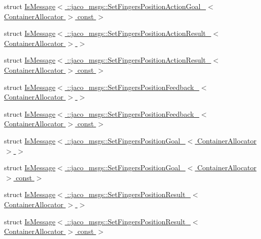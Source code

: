 \begin{DoxyCompactItemize}
\item 
struct \hyperlink{structros_1_1message__traits_1_1IsMessage_3_01_1_1jaco__msgs_1_1SetFingersPositionActionGoal___3cdf0887a72e87b8cff4cc9faad2fb585}{Is\+Message$<$ \+::jaco\+\_\+msgs\+::\+Set\+Fingers\+Position\+Action\+Goal\+\_\+$<$ Container\+Allocator $>$ const  $>$}
\item 
struct \hyperlink{structros_1_1message__traits_1_1IsMessage_3_01_1_1jaco__msgs_1_1SetFingersPositionActionResult__757ad1fe13355cb697d2ab8a4b4167d6}{Is\+Message$<$ \+::jaco\+\_\+msgs\+::\+Set\+Fingers\+Position\+Action\+Result\+\_\+$<$ Container\+Allocator $>$ $>$}
\item 
struct \hyperlink{structros_1_1message__traits_1_1IsMessage_3_01_1_1jaco__msgs_1_1SetFingersPositionActionResult__e9cfa5ea6f52c2558a064565c2b5cfc0}{Is\+Message$<$ \+::jaco\+\_\+msgs\+::\+Set\+Fingers\+Position\+Action\+Result\+\_\+$<$ Container\+Allocator $>$ const  $>$}
\item 
struct \hyperlink{structros_1_1message__traits_1_1IsMessage_3_01_1_1jaco__msgs_1_1SetFingersPositionFeedback___3_01ContainerAllocator_01_4_01_4}{Is\+Message$<$ \+::jaco\+\_\+msgs\+::\+Set\+Fingers\+Position\+Feedback\+\_\+$<$ Container\+Allocator $>$ $>$}
\item 
struct \hyperlink{structros_1_1message__traits_1_1IsMessage_3_01_1_1jaco__msgs_1_1SetFingersPositionFeedback___3_0b6f4c4f4ad48f6ea0780833a65c9145a}{Is\+Message$<$ \+::jaco\+\_\+msgs\+::\+Set\+Fingers\+Position\+Feedback\+\_\+$<$ Container\+Allocator $>$ const  $>$}
\item 
struct \hyperlink{structros_1_1message__traits_1_1IsMessage_3_01_1_1jaco__msgs_1_1SetFingersPositionGoal___3_01ContainerAllocator_01_4_01_4}{Is\+Message$<$ \+::jaco\+\_\+msgs\+::\+Set\+Fingers\+Position\+Goal\+\_\+$<$ Container\+Allocator $>$ $>$}
\item 
struct \hyperlink{structros_1_1message__traits_1_1IsMessage_3_01_1_1jaco__msgs_1_1SetFingersPositionGoal___3_01Conff0af772d8e2093cfa12496dacee7772}{Is\+Message$<$ \+::jaco\+\_\+msgs\+::\+Set\+Fingers\+Position\+Goal\+\_\+$<$ Container\+Allocator $>$ const  $>$}
\item 
struct \hyperlink{structros_1_1message__traits_1_1IsMessage_3_01_1_1jaco__msgs_1_1SetFingersPositionResult___3_01ContainerAllocator_01_4_01_4}{Is\+Message$<$ \+::jaco\+\_\+msgs\+::\+Set\+Fingers\+Position\+Result\+\_\+$<$ Container\+Allocator $>$ $>$}
\item 
struct \hyperlink{structros_1_1message__traits_1_1IsMessage_3_01_1_1jaco__msgs_1_1SetFingersPositionResult___3_01C59348744bb76bac82574dd918cd77dd6}{Is\+Message$<$ \+::jaco\+\_\+msgs\+::\+Set\+Fingers\+Position\+Result\+\_\+$<$ Container\+Allocator $>$ const  $>$}

\end{DoxyCompactItemize}
